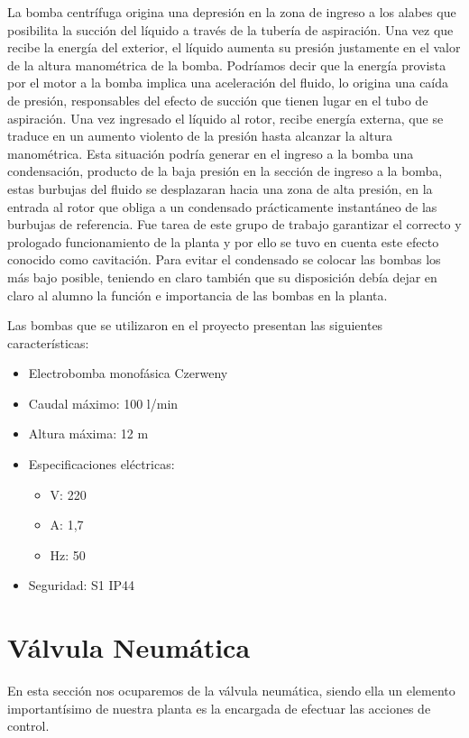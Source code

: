 La bomba centrífuga origina una depresión en la zona de ingreso a los alabes que posibilita
la succión del líquido a través de la tubería de aspiración. Una vez que recibe la energía del exterior, 
el líquido aumenta su presión justamente en el valor de la altura manométrica de la bomba. 
Podríamos decir que la energía provista por el motor a la bomba implica una aceleración del fluido, lo
origina una caída de presión, responsables del efecto de succión que tienen lugar en el tubo de 
aspiración. 
Una vez ingresado el líquido al rotor, recibe energía externa, que se traduce en un aumento violento de la
presión hasta alcanzar la altura manométrica.
Esta situación podría generar en el ingreso a la bomba una condensación, producto de la baja presión en 
la sección de ingreso a la bomba, estas burbujas del fluido se desplazaran hacia una zona de alta presión,
en la entrada al rotor que obliga a un condensado prácticamente instantáneo de las burbujas de referencia.
Fue tarea de este grupo de trabajo garantizar el correcto y prologado funcionamiento de la planta y por 
ello se tuvo en cuenta este efecto conocido como cavitación. Para evitar el condensado se colocar 
las bombas los más bajo posible, teniendo en claro también que su disposición debía dejar en claro al alumno
la función e importancia de las bombas en la planta.

Las bombas que se utilizaron en el proyecto presentan las siguientes características:

 \begin{itemize}
  \item Electrobomba monofásica Czerweny
  \item Caudal máximo: 100 l/min
  \item Altura máxima: 12 m
  \item Especificaciones eléctricas:
    \begin{itemize}
      \item V: 220
      \item A: 1,7
      \item Hz: 50
    \end{itemize}
  \item Seguridad: S1 IP44
 \end{itemize}

\section{Válvula Neumática}
\label{sec:ValvulaNeumatica}
En esta sección nos ocuparemos de la válvula neumática, siendo ella un elemento 
importantísimo de nuestra planta es la encargada de efectuar las acciones de
control.

